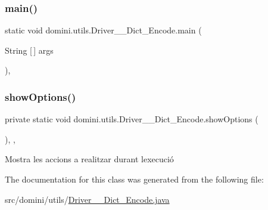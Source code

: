 \subsubsection{\texorpdfstring{main()}{main()}}
{\footnotesize\ttfamily static void domini.\+utils.\+Driver\+\_\+\+\_\+\+Dict\+\_\+\+Encode.\+main (\begin{DoxyParamCaption}\item[{String \mbox{[}$\,$\mbox{]}}]{args }\end{DoxyParamCaption})\hspace{0.3cm}{\ttfamily [inline]}, {\ttfamily [static]}}

\mbox{\label{classdomini_1_1utils_1_1Driver____Dict__Encode_a8b24c280193457c6620b2b5906018c34}} 
\subsubsection{\texorpdfstring{show\+Options()}{showOptions()}}
{\footnotesize\ttfamily private static void domini.\+utils.\+Driver\+\_\+\+\_\+\+Dict\+\_\+\+Encode.\+show\+Options (\begin{DoxyParamCaption}{ }\end{DoxyParamCaption})\hspace{0.3cm}{\ttfamily [inline]}, {\ttfamily [static]}, {\ttfamily [private]}}



Mostra les accions a realitzar durant l\textquotesingle{}execució 



The documentation for this class was generated from the following file\+:\begin{DoxyCompactItemize}
\item 
src/domini/utils/\hyperlink{Driver____Dict__Encode_8java}{Driver\+\_\+\+\_\+\+Dict\+\_\+\+Encode.\+java}\end{DoxyCompactItemize}
